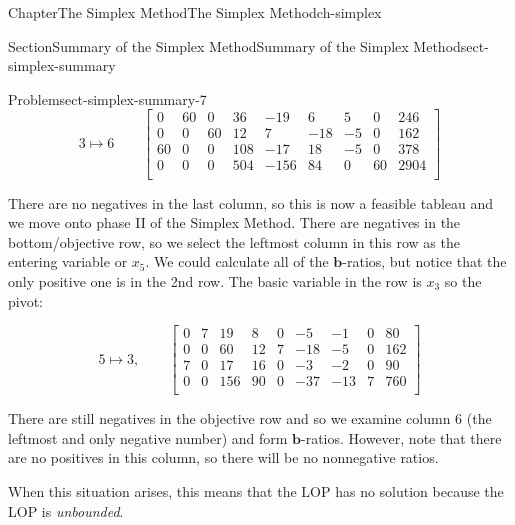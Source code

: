 \documentclass[oneside,10pt,]{book}
\numberwithin{equation}{section}
\newcommand{\amp}{&}
\begin{document}
\begin{chapterptx}{Chapter}{The Simplex Method}{}{The Simplex Method}{}{}{ch-simplex}
\begin{sectionptx}{Section}{Summary of the Simplex Method}{}{Summary of the Simplex Method}{}{}{sect-simplex-summary}
\begin{problem}{Problem}{}{sect-simplex-summary-7}
%
\begin{equation*}
3 \mapsto 6 \qquad \left[\begin{array}{rrrr|rrrr|r} 0 \amp 60 \amp 0 \amp 36 \amp -19 \amp 6 \amp 5 \amp 0 \amp 246\\ 0 \amp 0 \amp 60 \amp 12 \amp 7 \amp -18 \amp -5 \amp 0 \amp 162\\ 60 \amp 0 \amp 0 \amp 108 \amp -17 \amp 18 \amp -5 \amp 0 \amp 378\\ \hline 0 \amp 0 \amp 0 \amp 504 \amp -156 \amp 84 \amp 0 \amp 60 \amp 2904\\ \end{array} \right]
\end{equation*}
%
\par
There are no negatives in the last column, so this is now a feasible tableau and we move onto phase II of the Simplex Method. There are negatives in the bottom\slash{}objective row, so we select the leftmost column in this row as the entering variable or \(x_5\). We could calculate all of the \(\boldsymbol{b}\)-ratios, but notice that the only positive one is in the 2nd row. The basic variable in the row is \(x_3\) so the pivot:%
\par
%
\begin{equation*}
5 \mapsto 3, \qquad \left[\begin{array}{rrrr|rrrr|r} 0 \amp 7 \amp 19 \amp 8 \amp 0 \amp -5 \amp -1 \amp 0 \amp 80\\ 0 \amp 0 \amp 60 \amp 12 \amp 7 \amp -18 \amp -5 \amp 0 \amp 162\\ 7 \amp 0 \amp 17 \amp 16 \amp 0 \amp -3 \amp -2 \amp 0 \amp 90\\ \hline 0 \amp 0 \amp 156 \amp 90 \amp 0 \amp -37 \amp -13 \amp 7 \amp 760\\ \end{array} \right]
\end{equation*}
%
\par
There are still negatives in the objective row and so we examine column 6 (the leftmost and only negative number) and form \(\boldsymbol{b}\)-ratios. However, note that there are no positives in this column, so there will be no nonnegative ratios.%
\par
When this situation arises, this means that the LOP has no solution because the LOP is \emph{unbounded}.%
\end{problem}
\end{sectionptx}
\end{chapterptx}
%
%
\typeout{************************************************}
\end{document}
